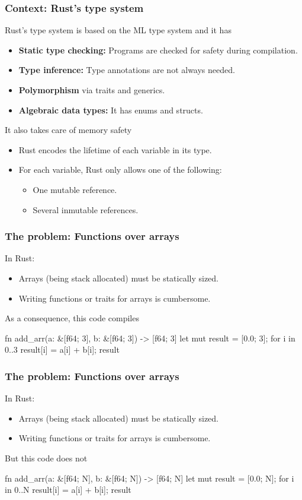 \documentclass{beamer}
\begin{document}
\begin{frame}[fragile]
    \frametitle{Context: Rust's type system}
    Rust's type system is based on the ML type system and it has
    \begin{itemize}
        \item \textbf{Static type checking:} Programs are checked for safety during compilation.
        \item \textbf{Type inference:} Type annotations are not always needed.
        \item \textbf{Polymorphism}  via traits and generics.
        \item \textbf{Algebraic data types:} It has enums and structs.
    \end{itemize}
    It also takes care of memory safety
    \begin{itemize}
        \item Rust encodes the lifetime of each variable in its type.
        \item For each variable, Rust only allows one of the following:
            \begin{itemize}
                \item One mutable reference.
                \item Several inmutable references.
            \end{itemize}
    \end{itemize}
\end{frame}

\begin{frame}[fragile]
    \frametitle{The problem: Functions over arrays}
    In Rust:
    \begin{itemize}
        \item Arrays (being stack allocated) must be statically sized.
        \item Writing functions or traits for arrays is cumbersome.
    \end{itemize}
    As a consequence, this code compiles
    \begin{rustcode}
    fn add_arr(a: &[f64; 3], b: &[f64; 3]) -> [f64; 3] {
        let mut result = [0.0; 3];
        for i in 0..3 {
            result[i] = a[i] + b[i];
        }
        result
    }
    \end{rustcode}
\end{frame}

\begin{frame}[fragile]
    \frametitle{The problem: Functions over arrays}
    In Rust:
    \begin{itemize}
        \item Arrays (being stack allocated) must be statically sized.
        \item Writing functions or traits for arrays is cumbersome.
    \end{itemize}
    But this code does not
    \begin{rustcode}
    fn add_arr(a: &[f64; N], b: &[f64; N]) -> [f64; N] {
        let mut result = [0.0; N];
        for i in 0..N {
            result[i] = a[i] + b[i];
        }
        result
    }
    \end{rustcode}
\end{frame}
\end{document}
